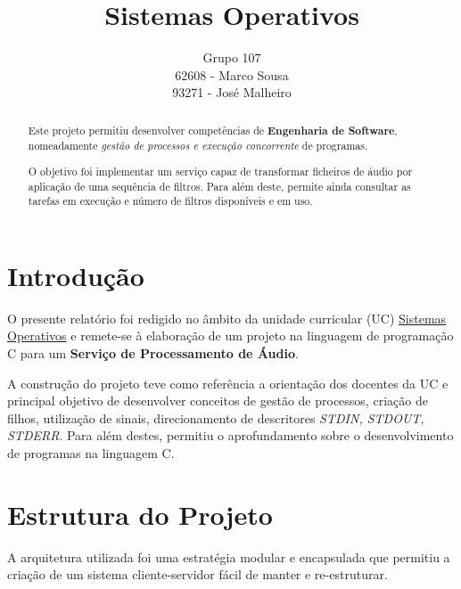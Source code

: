 \documentclass{article}
\title{Sistemas Operativos}
\author{Grupo 107 \\ 62608 - Marco Sousa \\ 93271 - José Malheiro}
\begin{document}
\maketitle

\begin{abstract}
    Este projeto permitiu desenvolver competências de \textbf{Engenharia de Software},
    nomeadamente \textit{gestão de processos e execução concorrente } de programas.

    O objetivo foi implementar um serviço capaz de transformar ficheiros de áudio por aplicação de uma sequência de filtros.
    Para além deste, permite ainda consultar as tarefas em execução e número de filtros disponíveis e em uso.
\end{abstract}

\section{Introdução}

O presente relatório foi redigido no âmbito da unidade curricular (UC) \underline{Sistemas Operativos}
e remete-se à elaboração de um projeto na linguagem de programação C para um \textbf{Serviço de Processamento de Áudio}.

A construção do projeto teve como referência a orientação dos docentes da UC e principal objetivo de desenvolver
conceitos de gestão de processos, criação de filhos, utilização de sinais, direcionamento de descritores \textit{STDIN, STDOUT, STDERR}.
Para além destes, permitiu o aprofundamento sobre o desenvolvimento de programas na linguagem C.

\section{Estrutura do Projeto}

A arquitetura utilizada foi uma estratégia modular e encapsulada que permitiu a criação de um sistema cliente-servidor fácil de manter e re-estruturar.
\end{document}
